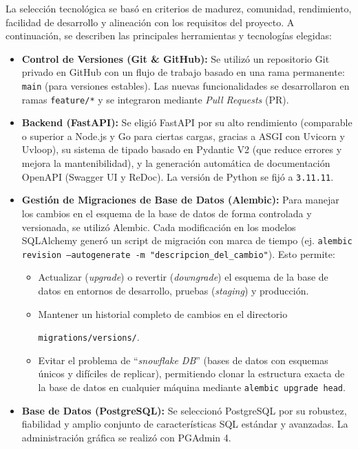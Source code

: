 La selección tecnológica se basó en criterios de madurez, comunidad, rendimiento, facilidad de desarrollo y alineación con los requisitos del proyecto. A continuación, se describen las principales herramientas y tecnologías elegidas:

\begin{itemize}[leftmargin=*]
  \item \textbf{Control de Versiones (Git \& GitHub):} Se utilizó un repositorio Git privado en GitHub con un flujo de trabajo basado en una rama permanente: \texttt{main} (para versiones estables). Las nuevas funcionalidades se desarrollaron en ramas \texttt{feature/*} y se integraron mediante \emph{Pull Requests} (PR).

  \item \textbf{Backend (FastAPI):} Se eligió FastAPI por su alto rendimiento (comparable o superior a Node.js y Go para ciertas cargas, gracias a ASGI con Uvicorn y Uvloop), su sistema de tipado basado en Pydantic V2 (que reduce errores y mejora la mantenibilidad), y la generación automática de documentación OpenAPI (Swagger UI y ReDoc). La versión de Python se fijó a \texttt{3.11.11}.

  \item \textbf{Gestión de Migraciones de Base de Datos (Alembic):} Para manejar los cambios en el esquema de la base de datos de forma controlada y versionada, se utilizó Alembic. Cada modificación en los modelos SQLAlchemy generó un script de migración con marca de tiempo (ej. \texttt{alembic revision --autogenerate -m "descripcion\_del\_cambio"}). Esto permite:
        \begin{itemize}
          \item Actualizar (\emph{upgrade}) o revertir (\emph{downgrade}) el esquema de la base de datos en entornos de desarrollo, pruebas (\emph{staging}) y producción.
          \item Mantener un historial completo de cambios en el directorio
          
          \texttt{migrations/versions/}.
          \item Evitar el problema de “\emph{snowflake DB}” (bases de datos con esquemas únicos y difíciles de replicar), permitiendo clonar la estructura exacta de la base de datos en cualquier máquina mediante \texttt{alembic upgrade head}.
        \end{itemize}

  \item \textbf{Base de Datos (PostgreSQL):} Se seleccionó PostgreSQL por su robustez, fiabilidad y amplio conjunto de características SQL estándar y avanzadas. La administración gráfica se realizó con PGAdmin 4.


\end{itemize}
